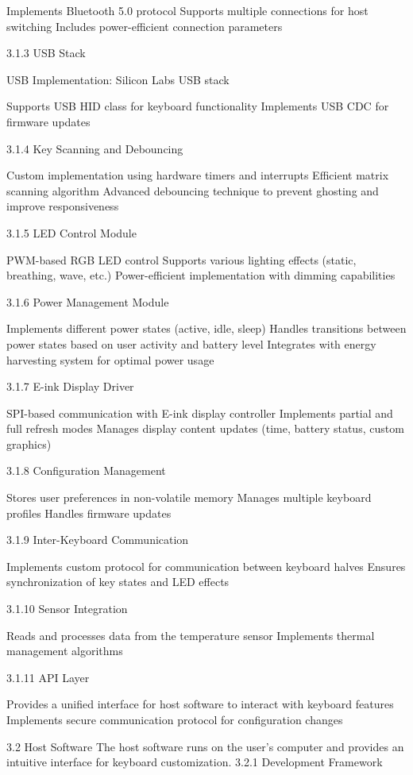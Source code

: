 \documentclass[a4paper,11pt]{article}%
\begin{document}
Implements Bluetooth 5.0 protocol
Supports multiple connections for host switching
Includes power-efficient connection parameters



3.1.3 USB Stack

USB Implementation: Silicon Labs USB stack

Supports USB HID class for keyboard functionality
Implements USB CDC for firmware updates



3.1.4 Key Scanning and Debouncing

Custom implementation using hardware timers and interrupts
Efficient matrix scanning algorithm
Advanced debouncing technique to prevent ghosting and improve responsiveness

3.1.5 LED Control Module

PWM-based RGB LED control
Supports various lighting effects (static, breathing, wave, etc.)
Power-efficient implementation with dimming capabilities

3.1.6 Power Management Module

Implements different power states (active, idle, sleep)
Handles transitions between power states based on user activity and battery level
Integrates with energy harvesting system for optimal power usage

3.1.7 E-ink Display Driver

SPI-based communication with E-ink display controller
Implements partial and full refresh modes
Manages display content updates (time, battery status, custom graphics)

3.1.8 Configuration Management

Stores user preferences in non-volatile memory
Manages multiple keyboard profiles
Handles firmware updates

3.1.9 Inter-Keyboard Communication

Implements custom protocol for communication between keyboard halves
Ensures synchronization of key states and LED effects

3.1.10 Sensor Integration

Reads and processes data from the temperature sensor
Implements thermal management algorithms

3.1.11 API Layer

Provides a unified interface for host software to interact with keyboard features
Implements secure communication protocol for configuration changes

3.2 Host Software
The host software runs on the user's computer and provides an intuitive interface for keyboard customization.
3.2.1 Development Framework
\end{document}
